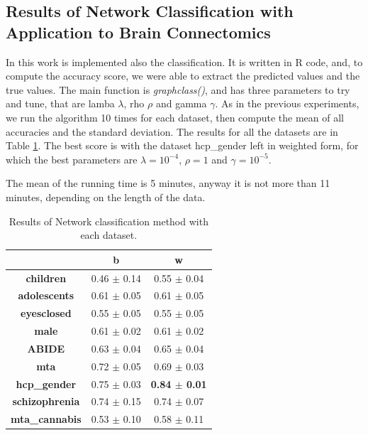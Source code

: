 \subsection{Results of Network Classification with Application to Brain Connectomics}

In this work is implemented also the classification. It is written in R code, and, to compute the accuracy score, we were able to extract the predicted values and the true values. The main function is \textit{graphclass()}, and has three parameters to try and tune, that are lamba $\lambda$, rho $\rho$ and gamma $\gamma$. As in the previous experiments, we run the algorithm 10 times for each dataset, then compute the mean of all accuracies and the standard deviation. The results for all the datasets are in Table \ref{tab:graphclass}. The best score is with the dataset hcp\_gender left in weighted form, for which the best parameters are $\lambda = 10^{-4} $, $\rho = 1$ and $\gamma = 10^{-5}$. 
\vspace{0.5cm}

The mean of the running time is 5 minutes, anyway it is not more than 11 minutes, depending on the length of the data. 

\begin{table}
	\centering
	\begin{tabular}{c|l|c} 
		\toprule
		& \multicolumn{1}{c|}{b} & w                \\ 
		\midrule
		\textbf{children}      & 0.46 $\pm$ 0.14        & 0.55 $\pm$ 0.04  \\
		\textbf{adolescents}   & 0.61 $\pm$ 0.05        & 0.61 $\pm$ 0.05  \\
		\textbf{eyesclosed}    & 0.55 $\pm$ 0.05        & 0.55 $\pm$ 0.05  \\
		\textbf{male}          & 0.61 $\pm$ 0.02        & 0.61 $\pm$ 0.02  \\
		\textbf{ABIDE}         & 0.63 $\pm$ 0.04        & 0.65 $\pm$ 0.04  \\
		\textbf{mta}           & 0.72 $\pm$ 0.05        & 0.69 $\pm$ 0.03  \\
		\textbf{hcp\_gender}   & 0.75 $\pm$ 0.03        & \textbf{0.84 $\pm$ 0.01}  \\
		\textbf{schizophrenia} & 0.74 $\pm$ 0.15        & 0.74 $\pm$ 0.07  \\
		\textbf{mta\_cannabis} & 0.53 $\pm$ 0.10        & 0.58 $\pm$ 0.11 \\
		\bottomrule
	\end{tabular}
\caption{Results of Network classification method with each dataset.}
\label{tab:graphclass}
\end{table}

